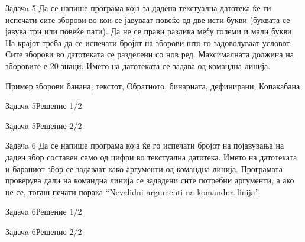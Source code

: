 \begin{frame}{Задачa 5}
Да се напише програма која за дадена текстуална датотека ќе ги испечати
сите зборови во кои се јавуваат повеќе од две исти букви (буквата се јавува три или
повеќе пати). Да не се прави разлика меѓу големи и мали букви. На крајот треба
да се испечати бројот на зборови што го задоволуваат условот. Сите зборови во
датотеката се разделени со нов ред. Максималната должина на зборовите е 20
знаци. Името на датотеката се задава од командна линија.
\begin{exampleblock}{Пример зборови}
банана, текстот, Обратното, бинарната, дефинирани, Копакабана
\end{exampleblock}
\end{frame}

\begin{frame}[fragile]{Задачa 5}{Решение 1/2}

\end{frame}

\begin{frame}[fragile]{Задачa 5}{Решение 2/2}

\end{frame}

\begin{frame}{Задачa 6}
Да се напише програма која ќе го испечати бројот на појавувања на даден збор
составен само од цифри во текстуална датотека. Името на датотеката и бараниот
збор се задаваат како аргументи од командна линија. Програмата проверува дали на
командна линија се зададени сите потребни аргументи, а ако не се, тогаш печати
порака ``Nevalidni argumenti na komandna linija''. 
\end{frame}

\begin{frame}[fragile]{Задачa 6}{Решение 1/2}

\end{frame}

\begin{frame}[fragile]{Задачa 6}{Решение 2/2}

\end{frame}

